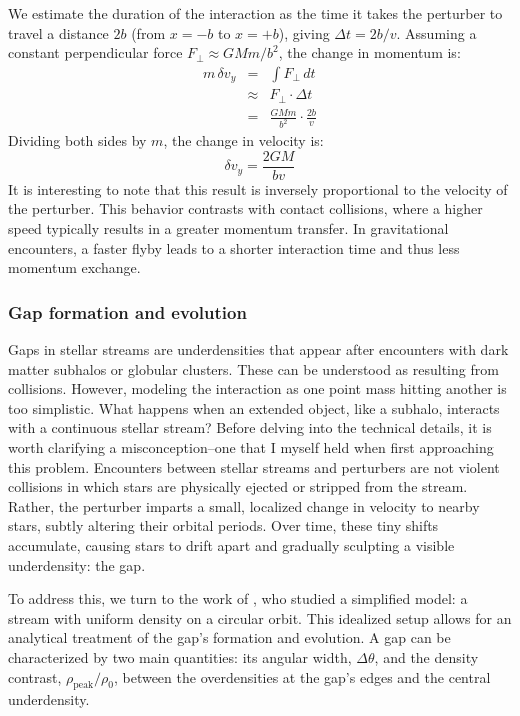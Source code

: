         We estimate the duration of the interaction as the time it takes the perturber to travel a distance $2b$ (from $x = -b$ to $x = +b$), giving $\Delta t = 2b/v$. Assuming a constant perpendicular force $F_\perp \approx GMm/b^2$, the change in momentum is:
        \begin{eqnarray}
        m\,\delta v_y &=& \int F_\perp \, dt \\
                    &\approx& F_\perp \cdot \Delta t \\
                    &=& \frac{GMm}{b^2} \cdot \frac{2b}{v}
        \end{eqnarray}
        Dividing both sides by $m$, the change in velocity is:
        \begin{equation}\label{eq:delta_v_impulse_approx}
        \delta v_y = \frac{2GM}{b v}
        \end{equation}
        It is interesting to note that this result is inversely proportional to the velocity of the perturber. This behavior contrasts with contact collisions, where a higher speed typically results in a greater momentum transfer. In gravitational encounters, a faster flyby leads to a shorter interaction time and thus less momentum exchange.
        \subsubsection{Gap formation and evolution}
            Gaps in stellar streams are underdensities that appear after encounters with dark matter subhalos or globular clusters. These can be understood as resulting from collisions. However, modeling the interaction as one point mass hitting another is too simplistic. What happens when an extended object, like a subhalo, interacts with a continuous stellar stream? Before delving into the technical details, it is worth clarifying a misconception--one that I myself held when first approaching this problem. Encounters between stellar streams and perturbers are not violent collisions in which stars are physically ejected or stripped from the stream. Rather, the perturber imparts a small, localized change in velocity to nearby stars, subtly altering their orbital periods. Over time, these tiny shifts accumulate, causing stars to drift apart and gradually sculpting a visible underdensity: the gap. 
            
            To address this, we turn to the work of \citet{2015MNRAS.450.1136E}, who studied a simplified model: a stream with uniform density on a circular orbit. This idealized setup allows for an analytical treatment of the gap's formation and evolution. A gap can be characterized by two main quantities: its angular width, $\Delta \theta$, and the density contrast, $\rho_{\mathrm{peak}}/\rho_0$, between the overdensities at the gap's edges and the central underdensity.

